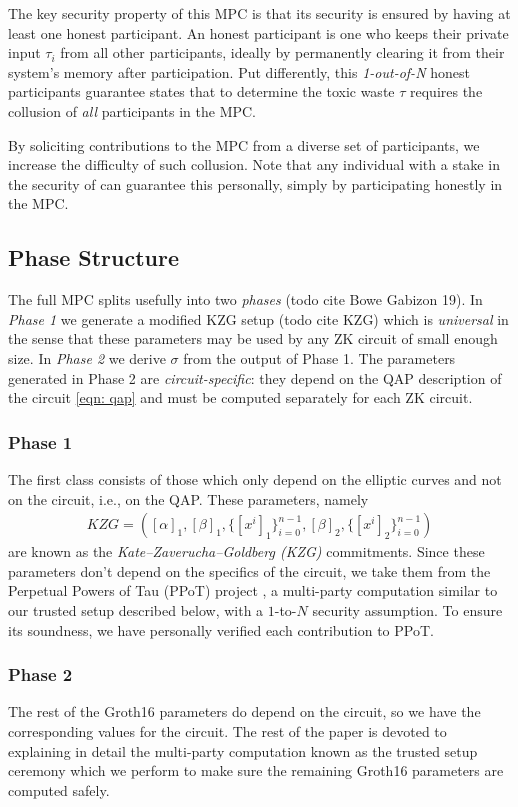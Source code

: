 The key security property of this MPC is that its security is ensured by having at least one honest participant. An honest participant is one who keeps their private input $\tau_i$ from all other participants, ideally by permanently clearing it from their system's memory after participation. Put differently, this \emph{1-out-of-N} honest participants guarantee states that to determine the toxic waste $\tau$ requires the collusion of \emph{all} participants in the MPC. 

By soliciting contributions to the MPC from a diverse set of participants, we increase the difficulty of such collusion. Note that any individual with a stake in the security of \MantaPay{} can guarantee this personally, simply by participating honestly in the \Setup{} MPC.

\subsection{Phase Structure}

The full \Setup{} MPC splits usefully into two \emph{phases} (todo cite Bowe Gabizon 19). In \emph{Phase 1} we generate a modified KZG setup (todo cite KZG) which is \emph{universal} in the sense that these parameters may be used by any ZK circuit of small enough size. In \emph{Phase 2} we derive $\sigma$ from the output of Phase 1. The parameters generated in Phase 2 are \emph{circuit-specific}: they depend on the QAP description of the circuit \eqref{eqn: qap} and must be computed separately for each ZK circuit.

\subsubsection{Phase 1}

The first class consists of those which only depend on the elliptic curves and not on the circuit, i.e., on the QAP. These parameters, namely
\begin{align}
KZG = ( [\alpha]_1, [\beta]_1, \{ [x^i]_1 \}_{i=0}^{n-1}, [\beta]_2, \{ [x^i]_2 \}_{i=0}^{n-1} ) 
\end{align}
are known as the \emph{Kate--Zaverucha--Goldberg (KZG)} commitments. Since these parameters don't depend on the specifics of the circuit, we take them from the Perpetual Powers of Tau (PPoT) project \cite{PPoT}, a multi-party computation similar to our trusted setup described below, with a $1$-to-$N$ security assumption. To ensure its soundness, we have personally verified each contribution to PPoT.

\subsubsection{Phase 2}
The rest of the Groth16 parameters do depend on the circuit, so we have the corresponding values for the \MantaPay{} circuit. The rest of the paper is devoted to explaining in detail the multi-party computation known as the trusted setup ceremony which we perform to make sure the remaining Groth16 parameters are computed safely.
